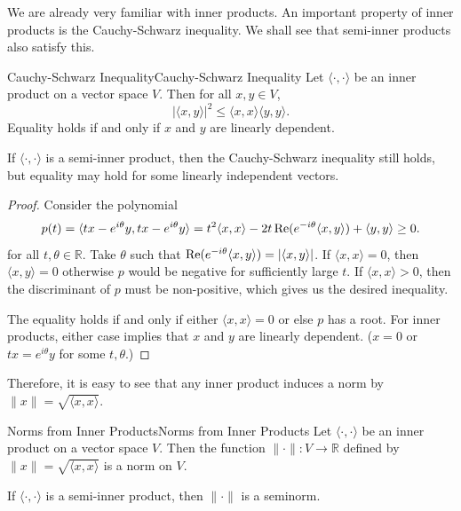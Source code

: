 \documentclass[../main.tex]{subfiles}
\begin{document}
We are already very familiar with inner products. An important property of inner products is the Cauchy-Schwarz inequality. We shall see that semi-inner products also satisfy this.
\begin{theorem}{Cauchy-Schwarz Inequality}{Cauchy-Schwarz Inequality}
  Let $\langle \cdot, \cdot \rangle$ be an inner product on a vector space $V$. Then for all $x, y \in V$,
  \begin{equation}
    |\langle x, y \rangle|^2 \leq \langle x, x \rangle \langle y, y \rangle.
  \end{equation}
  Equality holds if and only if $x$ and $y$ are linearly dependent.

  If $\langle \cdot, \cdot \rangle$ is a semi-inner product, then the Cauchy-Schwarz inequality still holds, but equality may hold for some linearly independent vectors.
\end{theorem}
\begin{proof}
  Consider the polynomial
  \begin{equation*}
    p(t) = \langle tx - e^{i\theta} y, tx - e^{i\theta} y \rangle = t^2 \langle x, x \rangle - 2t \operatorname{Re}(e^{-i\theta} \langle x, y \rangle) + \langle y, y \rangle \geq 0.
  \end{equation*}
  for all $t, \theta \in \mathbb{R}$. Take $\theta$ such that $\operatorname{Re}(e^{-i\theta} \langle x, y \rangle) = |\langle x, y \rangle|$. If $\langle x, x \rangle = 0$, then $\langle x, y \rangle = 0$ otherwise $p$ would be negative for sufficiently large $t$. If $\langle x, x \rangle > 0$, then the discriminant of $p$ must be non-positive, which gives us the desired inequality.

  The equality holds if and only if either $\langle x, x \rangle = 0$ or else $p$ has a root. For inner products, either case implies that $x$ and $y$ are linearly dependent. ($x = 0$ or $tx = e^{i\theta} y$ for some $t, \theta$.)
\end{proof}

Therefore, it is easy to see that any inner product induces a norm by $\|x\| = \sqrt{\langle x, x \rangle}$.
\begin{corollary}{Norms from Inner Products}{Norms from Inner Products}
  Let $\langle \cdot, \cdot \rangle$ be an inner product on a vector space $V$. Then the function $\|\cdot\|: V \to \mathbb{R}$ defined by $\|x\| = \sqrt{\langle x, x \rangle}$ is a norm on $V$.

  If $\langle \cdot, \cdot \rangle$ is a semi-inner product, then $\|\cdot\|$ is a seminorm.
\end{corollary}
\end{document}
